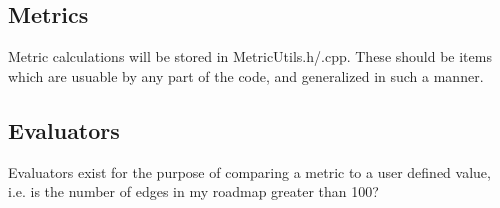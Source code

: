 \documentclass[12pt]{article}
\newcommand{\EXCISE}[1]{}
\begin{document}
\subsection{Metrics}
Metric calculations will be stored in MetricUtils.h/.cpp. These should be items which are usuable by any part of the
code, and generalized in such a manner. 

\subsection{Evaluators}
Evaluators exist for the purpose of comparing a metric to a user defined value, i.e. is the number of edges in my
roadmap greater than 100?


\EXCISE{

\section{Documentation}
All documentation should be done with DOxygen. DOxygen standards used within PMPL are not decided upon yet.

\section{Testing}
Currently only nightly compilation testing occurs nightly. This should be expanded in the future.

}
\end{document}
